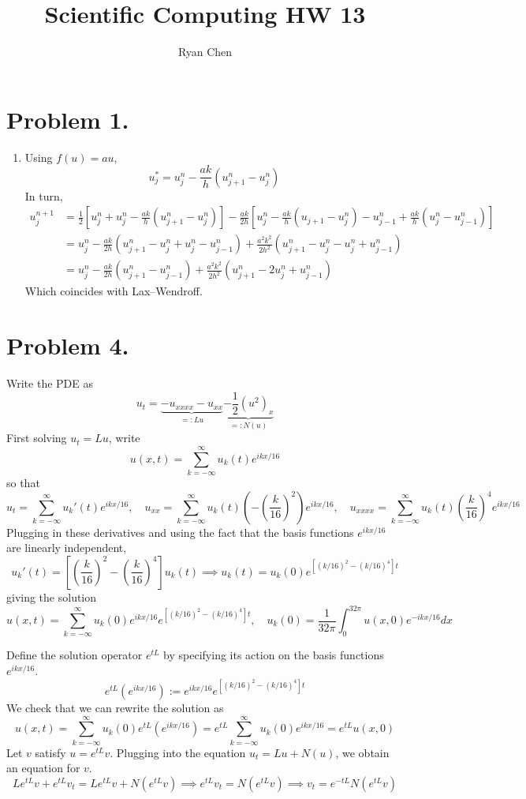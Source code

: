 \documentclass{article}
\title{Scientific Computing HW 13}
\author{Ryan Chen}
\newcommand{\br}[1]{\left(#1\right)}
\newcommand{\sbr}[1]{\left[#1\right]}
\newcommand{\imp}{\implies}
\begin{document}
	
\maketitle



\section*{Problem 1.}

\begin{enumerate}[label=(\alph*)]
	
\item Using $f(u)=au$,
$$u_j^* = u_j^n - \frac{ak}{h}(u_{j+1}^n - u_j^n)$$
In turn,
\begin{align*}
	u_j^{n+1} &= \frac12\sbr{u_j^n + u_j^n - \frac{ak}{h}(u_{j+1}^n - u_j^n)} - \frac{ak}{2h}\sbr{u_j^n - \frac{ak}{h}(u_{j+1} - u_j^n) - u_{j-1}^n + \frac{ak}{h}(u_j^n - u_{j-1}^n)}\\
	&= u_j^n - \frac{ak}{2h}(u_{j+1}^n - u_j^n + u_j^n - u_{j-1}^n) + \frac{a^2k^2}{2h^2}(u_{j+1}^n - u_j^n - u_j^n + u_{j-1}^n)\\
	&= u_j^n - \frac{ak}{2h}(u_{j+1}^n - u_{j-1}^n) + \frac{a^2k^2}{2h^2}(u_{j+1}^n - 2u_j^n + u_{j-1}^n)
\end{align*}
Which coincides with Lax--Wendroff.
 
\end{enumerate}



\section*{Problem 4.}
Write the PDE as
$$u_t = \underbrace{-u_{xxxx} - u_{xx}}_{=:Lu} \underbrace{-\frac12(u^2)_x}_{=:N(u)}$$
First solving $u_t=Lu$, write
$$u(x,t) = \sum_{k=-\infty}^{\infty} u_k(t)e^{ikx/16}$$
so that
$$u_t = \sum_{k=-\infty}^{\infty} u_k'(t)e^{ikx/16},
\quad u_{xx} = \sum_{k=-\infty}^{\infty} u_k(t)\br{-\br{\frac{k}{16}}^2}e^{ikx/16},
\quad u_{xxxx} = \sum_{k=-\infty}^{\infty} u_k(t)\br{\frac{k}{16}}^4e^{ikx/16}$$
Plugging in these derivatives and using the fact that the basis functions $e^{ikx/16}$ are linearly independent,
$$u_k'(t) = \sbr{\br{\frac{k}{16}}^2 - \br{\frac{k}{16}}^4}u_k(t)
\imp u_k(t) = u_k(0)e^{[(k/16)^2 - (k/16)^4]t}$$
giving the solution
$$u(x,t) = \sum_{k=-\infty}^{\infty} u_k(0)e^{ikx/16}e^{[(k/16)^2 - (k/16)^4]t},
\quad u_k(0) = \frac{1}{32\pi}\int_0^{32\pi} u(x,0)e^{-ikx/16}dx$$

Define the solution operator $e^{tL}$ by specifying its action on the basis functions $e^{ikx/16}$.
$$e^{tL}(e^{ikx/16}) := e^{ikx/16}e^{[(k/16)^2 - (k/16)^4]t}$$
We check that we can rewrite the solution as
$$u(x,t) = \sum_{k=-\infty}^{\infty} u_k(0)e^{tL}(e^{ikx/16})
= e^{tL}\sum_{k=-\infty}^{\infty} u_k(0)e^{ikx/16}
= e^{tL}u(x,0)$$
Let $v$ satisfy $u=e^{tL}v$. Plugging into the equation $u_t=Lu+N(u)$, we obtain an equation for $v$.
$$Le^{tL}v + e^{tL}v_t = Le^{tL}v + N(e^{tL}v)
\imp e^{tL}v_t = N(e^{tL}v)
\imp v_t = e^{-tL}N(e^{tL}v)$$
\end{document}
